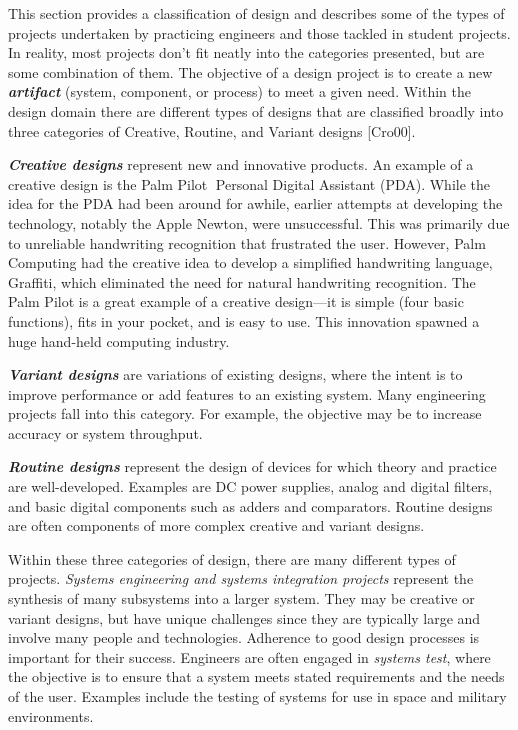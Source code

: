 This section provides a classification of design and describes some of
the types of projects undertaken by practicing engineers and those
tackled in student projects. In reality, most projects don't fit neatly
into the categories presented, but are some combination of them. The
objective of a design project is to create a new
\emph{\textbf{artifact}} (system, component, or process) to meet a given
need. Within the design domain there are different types of designs that
are classified broadly into three categories of Creative, Routine, and
Variant designs {[}Cro00{]}.

\emph{\textbf{Creative designs}} represent new and innovative products.
An example of a creative design is the Palm Pilot Personal Digital
Assistant (PDA). While the idea for the PDA had been around for awhile,
earlier attempts at developing the technology, notably the Apple Newton,
were unsuccessful. This was primarily due to unreliable handwriting
recognition that frustrated the user. However, Palm Computing had the
creative idea to develop a simplified handwriting language, Graffiti,
which eliminated the need for natural handwriting recognition. The Palm
Pilot is a great example of a creative design---it is simple (four basic
functions), fits in your pocket, and is easy to use. This innovation
spawned a huge hand-held computing industry.

\emph{\textbf{Variant designs}} are variations of existing designs,
where the intent is to improve performance or add features to an
existing system. Many engineering projects fall into this category. For
example, the objective may be to increase accuracy or system throughput.

\emph{\textbf{Routine designs}} represent the design of devices for
which theory and practice are well-developed. Examples are DC power
supplies, analog and digital filters, and basic digital components such
as adders and comparators. Routine designs are often components of more
complex creative and variant designs.

Within these three categories of design, there are many different types
of projects. \emph{Systems engineering and systems integration projects}
represent the synthesis of many subsystems into a larger system. They
may be creative or variant designs, but have unique challenges since
they are typically large and involve many people and technologies.
Adherence to good design processes is important for their success.
Engineers are often engaged in \emph{systems test}, where the objective
is to ensure that a system meets stated requirements and the needs of
the user. Examples include the testing of systems for use in space and
military environments.

